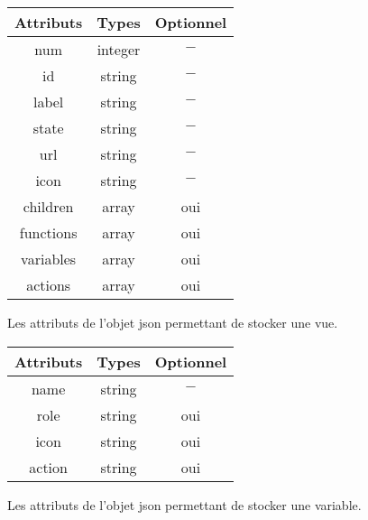 \documentclass[a4paper,11pt]{report}
\begin{document}
\begin{figure}[tbp]

\begin{minipage}{0.5\textwidth}
\begin{center}

\begin{tabular}{|c|c|c|}
   \hline
   Attributs & Types & Optionnel \\
   \hline
   num &  integer & $-$\\
   \hline
   id  & string & $-$ \\
    \hline
   label & string & $-$ \\
   \hline
   state & string  & $-$  \\
   \hline
   url & string & $-$ \\
   \hline
   icon & string & $-$ \\
   \hline
   children &  array & oui \\
   \hline
   functions & array & oui  \\
   \hline
   variables & array & oui  \\
   \hline
   actions & array & oui  \\
   \hline
 \end{tabular}
 \caption{Les attributs de l'objet  json permettant de stocker une vue. \label{si:vue} }
\end{center}
\end{minipage}

\begin{minipage}{0.5\textwidth}
\begin{center}
 \begin{tabular}{|c|c|c|}
   \hline
   Attributs & Types & Optionnel \\
   \hline
   name &  string & $-$\\
   \hline
   role  & string & oui \\
    \hline
   icon & string & oui \\
   \hline
   action & string  & oui  \\
    \hline
 \end{tabular}
 \caption{Les attributs de l'objet  json permettant de stocker une variable. \label{si:act} }
\end{center}
\end{minipage}

\end{figure}
\end{document}
